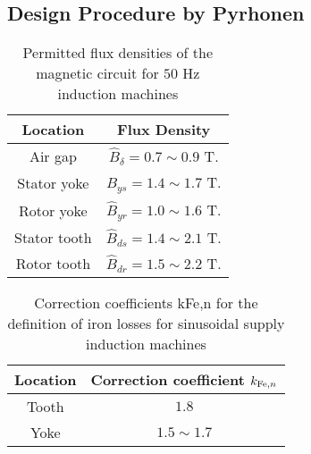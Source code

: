 \documentclass[]{interact}
\begin{document}
\subsection{Design Procedure by Pyrhonen}













\begin{table}[!t]
  \caption{Permitted flux densities of the magnetic circuit for $50$ Hz induction machines \cite[Table6.1]{2009-Pyrhonen.Jokinen.ea-Book-Designrotatingelectrical}}    %
  \centering                %
    \begin{tabular}{cc}
        \hline
        \hline
        Location & Flux Density \\
        \hline
        Air gap      & $\hat B_{\delta}=0.7 \sim  0.9$ T.   \\
        Stator yoke  & $\hat B_{ys}=1.4\sim 1.7$ T.   \\
        Rotor yoke   & $\hat B_{yr}=1.0\sim 1.6$ T.   \\
        Stator tooth  & $\hat B_{ds}=1.4\sim 2.1$ T.   \\
        Rotor tooth   & $\hat B_{dr}=1.5\sim 2.2$ T.   \\
        \hline
    \end{tabular}
  \label{tab:6.1}      %
\end{table}
\begin{table}[!t]
  \caption{Correction coefficients kFe,n for the definition of iron losses for sinusoidal supply induction machines \cite[Table3.2]{2009-Pyrhonen.Jokinen.ea-Book-Designrotatingelectrical}}    %
  \centering                %
    \begin{tabular}{cc}
        \hline
        \hline
        Location & Correction coefficient $k_{{\rm Fe},n}$ \\
        \hline
        Tooth  & $1.8$   \\
        Yoke   & $1.5\sim 1.7$   \\
        \hline
    \end{tabular}
  \label{tab:3.2}      %
\end{table}




\end{document}
